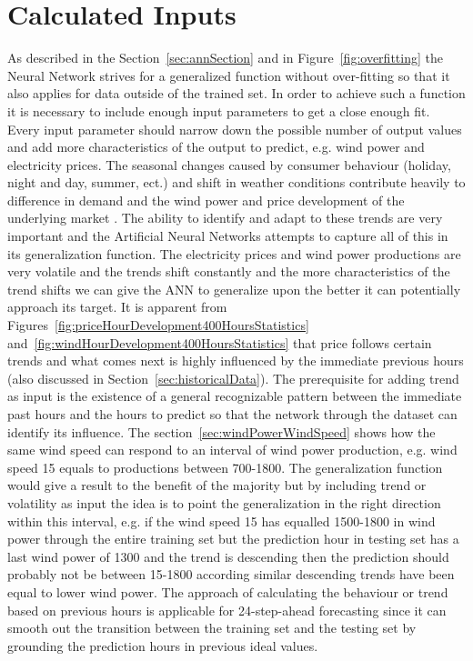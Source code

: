 \section{Calculated Inputs}
\label{sec:usingStatisticalInput}
As described in the Section~\ref{sec:annSection} and in Figure~\ref{fig:overfitting} the Neural Network strives for a generalized function without over-fitting so that it also applies for data outside of the trained set. In order to achieve such a function it is necessary to include enough input parameters to get a close enough fit. Every input parameter should narrow down the possible number of output values and add more characteristics of the output to predict, e.g. wind power and electricity prices. The seasonal changes caused by consumer behaviour (holiday, night and day, summer, ect.) and shift in weather conditions contribute heavily to difference in demand and the wind power and price development of the underlying market \cite{yamin2004adaptive,forecastingSpotPricesAccountingForWindPower}. The ability to identify and adapt to these trends are very important and the Artificial Neural Networks attempts to capture all of this in its generalization function. The electricity prices and wind power productions are very volatile and the trends shift constantly and the more characteristics of the trend shifts we can give the ANN to generalize upon the better it can potentially approach its target. It is apparent from Figures~\ref{fig:priceHourDevelopment400HoursStatistics} and~\ref{fig:windHourDevelopment400HoursStatistics} that price follows certain trends and what comes next is highly influenced by the immediate previous hours (also discussed in Section~\ref{sec:historicalData}). The prerequisite for adding trend as input is the existence of a general recognizable pattern between the immediate past hours and the hours to predict so that the network through the dataset can identify its influence. The section~\ref{sec:windPowerWindSpeed} shows how the same wind speed can respond to an interval of wind power production, e.g. wind speed 15 equals to productions between 700-1800. The generalization function would give a result to the benefit of the majority but by including trend or volatility as input the idea is to point the generalization in the right direction within this interval, e.g. if the wind speed 15 has equalled 1500-1800 in wind power through the entire training set but the prediction hour in testing set has a last wind power of 1300 and the trend is descending then the prediction should probably not be between 15-1800 according similar descending trends have been equal to lower wind power. The approach of calculating the behaviour or trend based on previous hours is applicable for 24-step-ahead forecasting since it can smooth out the transition between the training set and the testing set by grounding the prediction hours in previous ideal values. 

